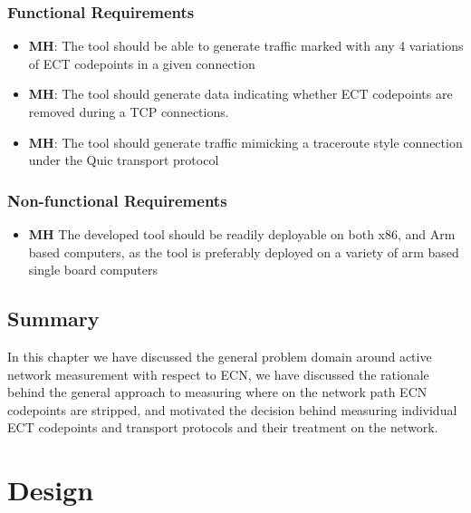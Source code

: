 \documentclass{l4proj}
\begin{document}
\subsection{Functional Requirements}

\begin{itemize}
    \item \textbf{MH}: The tool should be able to generate traffic marked with any 4 variations of ECT codepoints in a given connection
    \item \textbf{MH}: The tool should generate data indicating whether ECT codepoints are removed during a TCP connections.
    \item \textbf{MH}: The tool should generate traffic mimicking a traceroute style connection under the Quic transport protocol
\end{itemize}



\subsection{Non-functional Requirements}

\begin{itemize}
    \item \textbf{MH} The developed tool should be readily deployable on both x86, and Arm based computers, as the tool is preferably deployed on a variety of arm based single board computers
\end{itemize}

\section{Summary}

In this chapter we have discussed the general problem domain around active network measurement with respect to ECN, we have discussed the rationale behind the general approach to measuring where on the network path ECN codepoints are stripped, and motivated the decision behind measuring individual ECT codepoints and transport protocols and their treatment on the network.




\chapter{Design}
\label{chap:design}
\end{document}
